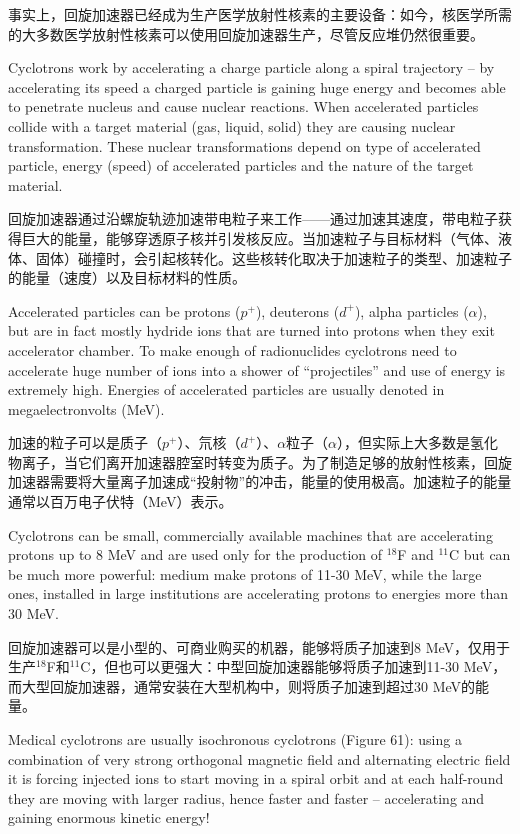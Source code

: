 \documentclass[dvipsnames, svgnames,a4paper,11pt]{article}
\begin{document}
事实上，回旋加速器已经成为生产医学放射性核素的主要设备：如今，核医学所需的大多数医学放射性核素可以使用回旋加速器生产，尽管反应堆仍然很重要。

Cyclotrons work by accelerating a charge particle along a spiral trajectory – by accelerating its speed a charged particle is gaining huge energy and becomes able to penetrate nucleus and cause nuclear reactions. When accelerated particles collide with a target material (gas, liquid, solid) they are causing nuclear transformation. These nuclear transformations depend on type of accelerated particle, energy (speed) of accelerated particles and the nature of the target material.
  
回旋加速器通过沿螺旋轨迹加速带电粒子来工作——通过加速其速度，带电粒子获得巨大的能量，能够穿透原子核并引发核反应。当加速粒子与目标材料（气体、液体、固体）碰撞时，会引起核转化。这些核转化取决于加速粒子的类型、加速粒子的能量（速度）以及目标材料的性质。
  
Accelerated particles can be protons ($p^+$), deuterons ($d^+$), alpha particles ($\alpha$), but are in fact mostly hydride ions that are turned into protons when they exit accelerator chamber. To make enough of radionuclides cyclotrons need to accelerate huge number of ions into a shower of “projectiles” and use of energy is extremely high. Energies of accelerated particles are usually denoted in megaelectronvolts (MeV).
  
加速的粒子可以是质子（$p^+$）、氘核（$d^+$）、$\alpha$粒子（$\alpha$），但实际上大多数是氢化物离子，当它们离开加速器腔室时转变为质子。为了制造足够的放射性核素，回旋加速器需要将大量离子加速成“投射物”的冲击，能量的使用极高。加速粒子的能量通常以百万电子伏特（MeV）表示。
  
Cyclotrons can be small, commercially available machines that are accelerating protons up to 8 MeV and are used only for the production of $^{18}$F and $^{11}$C but can be much more powerful: medium make protons of 11-30 MeV, while the large ones, installed in large institutions are accelerating protons to energies more than 30 MeV.
  
回旋加速器可以是小型的、可商业购买的机器，能够将质子加速到8 MeV，仅用于生产$^{18}$F和$^{11}$C，但也可以更强大：中型回旋加速器能够将质子加速到11-30 MeV，而大型回旋加速器，通常安装在大型机构中，则将质子加速到超过30 MeV的能量。


Medical cyclotrons are usually isochronous cyclotrons (Figure 61): using a combination of very strong orthogonal magnetic field and alternating electric field it is forcing injected ions to start moving in a spiral orbit and at each half-round they are moving with larger radius, hence faster and faster – accelerating and gaining enormous kinetic energy!
\end{document}

